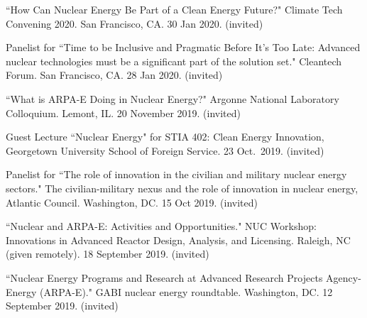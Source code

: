 \begin{bibsection}
\item ``How Can Nuclear Energy Be Part of a Clean Energy Future?" Climate Tech Convening 2020. San Francisco, CA. 30 Jan 2020.
(invited)

\item Panelist for ``Time to be Inclusive and Pragmatic Before It’s Too Late: Advanced nuclear technologies must be a significant part of the solution set." Cleantech Forum. San Francisco, CA. 28 Jan 2020.
(invited)

\item ``What is ARPA-E Doing in Nuclear Energy?" Argonne National
Laboratory Colloquium. Lemont, IL. 20 November 2019. (invited)


\item Guest Lecture ``Nuclear Energy" for STIA 402: Clean Energy Innovation, Georgetown University School of Foreign Service. 23 Oct.\ 2019. (invited)

\item Panelist for ``The role of innovation in the civilian and
military nuclear energy sectors." The civilian-military nexus and the role of
innovation in nuclear energy, Atlantic Council. Washington, DC. 15 Oct 2019.
(invited)


\item ``Nuclear and ARPA-E: Activities and Opportunities." NUC
Workshop: Innovations in Advanced Reactor Design, Analysis, and Licensing.
Raleigh, NC (given remotely). 18 September 2019. (invited)

\item ``Nuclear Energy Programs and Research at Advanced
Research Projects Agency-Energy (ARPA-E)." GABI nuclear energy roundtable.
Washington, DC. 12 September 2019. (invited)




\end{bibsection}
